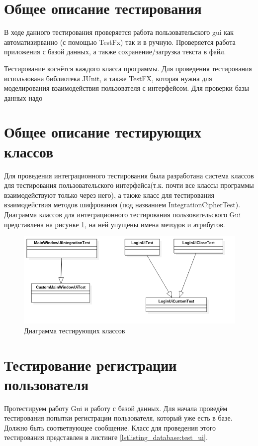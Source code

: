 \documentclass[a4paper,12pt]{article}
\begin{document}
\newpage\section{Общее описание тестирования}
В ходе данного тестирования проверяется работа пользовательского gui как автоматизирванно (с помощью TestFx) так и в ручную. Проверяется работа приложения с базой данных, а также сохранение/загрузка текста в файл.

\par Тестирование коснётся каждого класса программы.
Для проведения тестирования использована библиотека JUnit, а также TestFX, которая нужна для моделирования взаимодействия пользователя с интерфейсом. Для проверки базы данных надо 

\newpage\section{Общее описание тестирующих классов}
Для проведения интеграционного тестирования была разработана система классов для тестирования пользовательского интерфейса(т.к. почти все классы программы взаимодействуют только через него), а также класс для тестирования взаимодействия методов шифрования (под названием IntegrationCipherTest). Диаграмма классов для интеграционного тестирования пользовательского Gui представлена на рисунке \ref{fig:class_diagram_test_gui}, на ней упущены имена методов и атрибутов.
\begin{center}
	\begin{figure}[h!]
		\centering
   		\includegraphics[scale=0.6]{img/class_diagram_testing.png}
   		\caption{Диаграмма тестирующих классов}
   		\label{fig:class_diagram_test_gui}
    \end{figure}
\end{center}

\newpage \section{Тестирование регистрации пользователя}
Протестируем работу Gui и работу с базой данных.  
Для начала проведём тестирования попытки регистрации пользователя, который уже есть в базе. Должно быть соответвующее сообщение. Класс для проведения этого тестирования представлен в листинге \ref{lstlisting_database:test_ui}.
\end{document}

